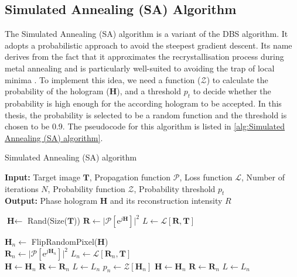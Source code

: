 \subsection{Simulated Annealing (SA) Algorithm}\label{sec:Simulated Annealing (SA) Algorithm}
The Simulated Annealing (SA) algorithm \cite{Kirkpatrick1983} is a variant of the DBS algorithm. It adopts a probabilistic approach to avoid the steepest gradient descent. Its name derives from the fact that it approximates the recrystallisation process during metal annealing and is particularly well-suited to avoiding the trap of local minima \cite{Yang2009}. To implement this idea, we need a function ($\mathcal{Z}$) to calculate the probability of the hologram ($\textbf{H}$), and a threshold $p_t$ to decide whether the probability is high enough for the according hologram to be accepted. In this thesis, the probability is selected to be a random function and the threshold is chosen to be 0.9. The pseudocode for this algorithm is listed in \cref{alg:Simulated Annealing (SA) algorithm}.
\begin{algorithm}[H]
  \caption{Simulated Annealing (SA) algorithm}\label{alg:Simulated Annealing (SA) algorithm}
  \textbf{Input:} Target image $\textbf{T}$, Propagation function $\mathcal{P}$, Loss function $\mathcal{L}$, Number of iterations $N$, Probability function $\mathcal{Z}$, Probability threshold $p_t$ \\
  \textbf{Output:} Phase hologram $\textbf{H}$ and its reconstruction intensity $R$
  \begin{algorithmic}
    \State $\textbf{H} \gets$ Rand(Size($\textbf{T}$))
    \State $\textbf{R} \gets \vert \mathcal{P}[\mathrm{e}^{j\textbf{H}}] \vert ^2$
    \State $L \gets \mathcal{L} [\textbf{R}, \textbf{T}]$

    \State $\textbf{H}_n \gets$ FlipRandomPixel($\textbf{H}$)\\
    \State $\textbf{R}_n \gets \vert \mathcal{P}[\mathrm{e}^{j\textbf{H}_n}] \vert ^2$
    \State $L_n \gets \mathcal{L} [\textbf{R}_n, \textbf{T}]$\\
    \State $\textbf{H} \gets \textbf{H}_n$
    \State $\textbf{R} \gets \textbf{R}_n$
    \State $L \gets L_n$
    \Else
    \State $p_n \gets \mathcal{Z}[\textbf{H}_n]$
    \State $\textbf{H} \gets \textbf{H}_n$
    \State $\textbf{R} \gets \textbf{R}_n$
    \State $L \gets L_n$
    \EndIf
    \EndIf
    \EndFor
  \end{algorithmic}
\end{algorithm}

